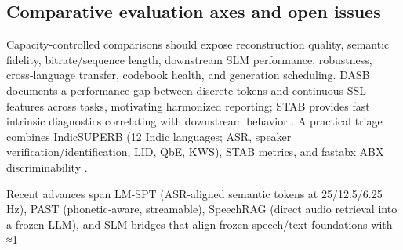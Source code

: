 \documentclass{article}
\begin{document}
\subsection{Comparative evaluation axes and open issues} \label{subsec:Comparative evaluation axes and open issues}
Capacity‑controlled comparisons should expose reconstruction quality, semantic fidelity, bitrate/sequence length, downstream SLM performance, robustness, cross‑language transfer, codebook health, and generation scheduling. DASB documents a performance gap between discrete tokens and continuous SSL features across tasks, motivating harmonized reporting; STAB provides fast intrinsic diagnostics correlating with downstream behavior \cite{mousavi2024dasbdiscreteaudiospeechbenchmark,vashishth2024stabspeechtokenizerassessmentbenchmark}. A practical triage combines IndicSUPERB (12 Indic languages; ASR, speaker verification/identification, LID, QbE, KWS), STAB metrics, and fastabx ABX discriminability \cite{vashishth2024stabspeechtokenizerassessmentbenchmark,poli2025fastabxlibraryefficientcomputationabxdis,entry2025indicsuperbspeechprocessinguniversalperf}.

Recent advances span LM‑SPT (ASR‑aligned semantic tokens at 25/12.5/6.25 Hz), PAST (phonetic‑aware, streamable), SpeechRAG (direct audio retrieval into a frozen LLM), and SLM bridges that align frozen speech/text foundations with ≈1%
\end{document}

